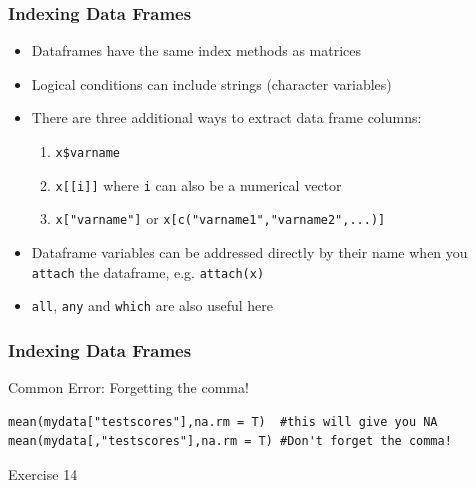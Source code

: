 \documentclass[xcolor={svgnames},10pt,
handout
]{beamer}
\begin{document}
\begin{frame}\frametitle{Indexing Data Frames}
\begin{itemize}
\item Dataframes have the same index methods as matrices
\item Logical conditions can include strings (character variables)
\item There are three additional ways to extract data frame columns:
\begin{enumerate}
\item \texttt{x\$varname}
\item \texttt{x[[i]]} \newline
where \texttt{i} can also be a numerical vector
\item \texttt{x["varname"]} \newline
or \texttt{x[c("varname1","varname2",...)]}
\end{enumerate}
\item Dataframe variables can be addressed directly by their name when you 
\texttt{attach} the dataframe, e.g. \texttt{attach(x)}
\item \texttt{all}, \texttt{any} and \texttt{which} are also useful here
\end{itemize}
\end{frame}

\begin{frame}[fragile]
\frametitle{Indexing Data Frames}
Common Error: Forgetting the comma!

\begin{lstlisting}
mean(mydata["testscores"],na.rm = T)  #this will give you NA
mean(mydata[,"testscores"],na.rm = T) #Don't forget the comma!
\end{lstlisting}
\end{frame}

\begin{frame}[standout]
Exercise 14
\end{frame}
\end{document}
